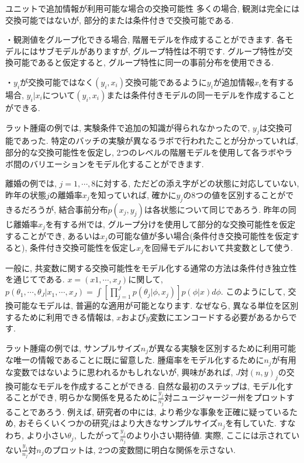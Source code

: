 \documentclass[10pt,dvipdfmx,a4]{beamer}
\begin{document}
\begin{frame}{ユニットで追加情報が利用可能な場合の交換可能性}
多くの場合, 観測は完全には交換可能ではないが, 部分的または条件付きで交換可能である.

・観測値をグループ化できる場合, 階層モデルを作成することができます.
各モデルにはサブモデルがありますが, グループ特性は不明です.
グループ特性が交換可能であると仮定すると, グループ特性に同一の事前分布を使用できる.

・$y_i$が交換可能ではなく$(y_i, x_i)$交換可能であるように$y_i$が追加情報$x_i$を有する場合, $y_i|x_i$について$(y_i, x_i)$または条件付きモデルの同一モデルを作成することができる.

ラット腫瘍の例では, 実験条件で追加の知識が得られなかったので, $y_j$は交換可能であった.
特定のバッチの実験が異なるラボで行われたことが分かっていれば, 部分的な交換可能性を仮定し, 2つのレベルの階層モデルを使用して各ラボやラボ間のバリエーションをモデル化することができます.
\end{frame}


\begin{frame}
離婚の例では, $j=1,\cdots,8$に対する, ただどの添え字がどの状態に対応していない, 昨年の状態$j$の離婚率$x_j$を知っていれば, 確かに$y_j$の8つの値を区別することができるだろうが, 結合事前分布$p(x_j, y_j)$は各状態について同じであろう.
昨年の同じ離婚率$x_j$を有する州では, グループ分けを使用して部分的な交換可能性を仮定することができ, あるいは$x_j$の可能な値が多い場合(条件付き交換可能性を仮定すると), 条件付き交換可能性を仮定し$x_j$を回帰モデルにおいて共変数として使う.

一般に, 共変数に関する交換可能性をモデル化する通常の方法は条件付き独立性を通じてである.
$x=(x1,\cdots,x_J)$に関して, $p(\theta_1,\cdots,\theta_J|x_1,\cdots,x_J)=\int [\prod_{j=1}^J p(\theta_j|\phi,x_j)]p(\phi|x)d\phi$.
このようにして, 交換可能なモデルは, 普遍的な適用が可能となります.
なぜなら, 異なる単位を区別するために利用できる情報は, $x$および$y$変数にエンコードする必要があるからです.
\end{frame}


\begin{frame}
ラット腫瘍の例では, サンプルサイズ$n_j$が異なる実験を区別するために利用可能な唯一の情報であることに既に留意した.
腫瘍率をモデル化するために$n_j$が有用な変数ではないように思われるかもしれないが, 興味があれば, $J$対$(n,y)_j$の交換可能なモデルを作成することができる.
自然な最初のステップは, モデル化することができ, 明らかな関係を見るために$\tfrac{y_j}{n_j}$対ニュージャージー州をプロットすることであろう.
例えば, 研究者の中には, より希少な事象を正確に疑っているため, おそらくいくつかの研究$j$はより大きなサンプルサイズ$n_j$を有していた.
すなわち, より小さい$\theta_j$, したがって$\frac{y_j}{n_j}$のより小さい期待値.
実際, ここには示されていない$\frac{y_j}{n_j}$対$n_j$のプロットは, 2つの変数間に明白な関係を示さない.
\end{frame}
\end{document}
